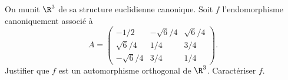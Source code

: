 \begin{enonce}
\begin{exercise}[ID={RMS123 E983, Mines Nancy PSI},subtitle={},tags={}, difficulty={0}]
On munit $\R^3$ de sa structure euclidienne canonique.
Soit $f$ l'endomorphisme canoniquement associé à 
\begin{equation*}
  A=
  \begin{pmatrix}
  -1/2 & -\sqrt6/4 & \sqrt6/4\\
  \sqrt6/4 & 1/4 & 3/4\\
  -\sqrt6/4 & 3/4 & 1/4
  \end{pmatrix}.
\end{equation*}
Justifier que $f$ est un automorphisme orthogonal de $\R^3$. Caractériser $f$.
\end{exercise}
\begin{solution}
\end{solution}
\end{enonce}
